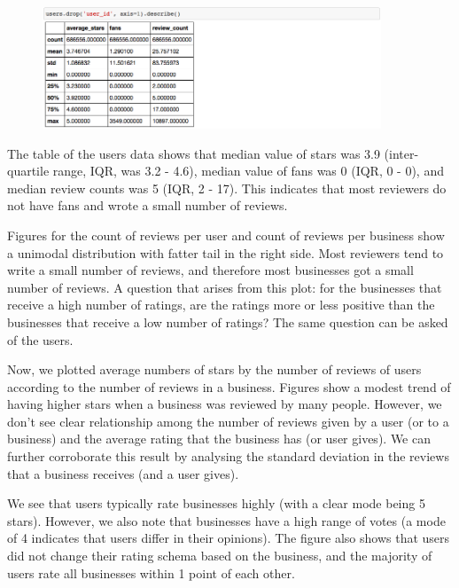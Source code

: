 \documentclass[11pt]{article}
\begin{document}
\begin{figure}[!htb]
\centering
\includegraphics[width=0.9\textwidth]{./ac209/userdescribe.png}
\end{figure}

\par The table of the users data shows that median value of stars was 3.9 (inter-quartile range, IQR, was 3.2 - 4.6), median value of fans was 0 (IQR, 0 - 0), and median review counts was 5 (IQR, 2 - 17). This indicates that most reviewers do not have fans and wrote a small number of reviews.

\par Figures for the count of reviews per user and count of reviews per business show a unimodal distribution with fatter tail in the right side. Most reviewers tend to write a small number of reviews, and therefore most businesses got a small number of reviews. A question that arises from this plot: for the businesses that receive a high number of ratings, are the ratings more or less positive than the businesses that receive a low number of ratings? The same question can be asked of the users.

\par Now, we plotted average numbers of stars by the number of reviews of users according to the number of reviews in a business. Figures show a modest trend of having higher stars when a business was reviewed by many people. However, we don't see clear relationship among the number of reviews given by a user (or to a business) and the average rating that the business has (or user gives). We can further corroborate this result by analysing the standard deviation in the reviews that a business receives (and a user gives). 

\par We see that users typically rate businesses highly (with a clear mode being 5 stars). However, we also note that businesses have a high range of votes (a mode of 4 indicates that users differ in their opinions). The figure also shows that users did not change their rating schema based on the business, and the majority of users rate all businesses within 1 point of each other. 
\end{document}
